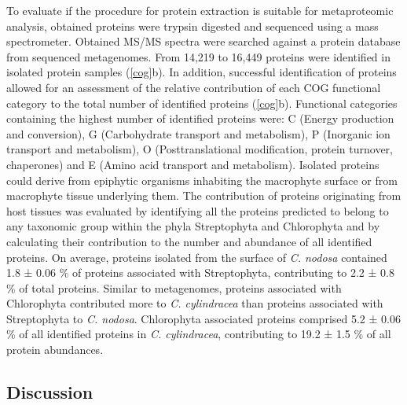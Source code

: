 \documentclass[12pt,]{article}
\begin{document}
To evaluate if the procedure for protein extraction is suitable for
metaproteomic analysis, obtained proteins were trypsin digested and
sequenced using a mass spectrometer. Obtained MS/MS spectra were
searched against a protein database from sequenced metagenomes. From
14,219 to 16,449 proteins were identified in isolated protein samples
(\autoref{cog}b). In addition, successful identification of proteins
allowed for an assessment of the relative contribution of each COG
functional category to the total number of identified proteins
(\autoref{cog}b). Functional categories containing the highest number of
identified proteins were: C (Energy production and conversion), G
(Carbohydrate transport and metabolism), P (Inorganic ion transport and
metabolism), O (Posttranslational modification, protein turnover,
chaperones) and E (Amino acid transport and metabolism). Isolated
proteins could derive from epiphytic organisms inhabiting the macrophyte
surface or from macrophyte tissue underlying them. The contribution of
proteins originating from host tissues was evaluated by identifying all
the proteins predicted to belong to any taxonomic group within the phyla
Streptophyta and Chlorophyta and by calculating their contribution to
the number and abundance of all identified proteins. On average,
proteins isolated from the surface of \emph{C. nodosa} contained 1.8 ±
0.06 \si{\percent} of proteins associated with Streptophyta,
contributing to 2.2 ± 0.8 \si{\percent} of total proteins. Similar to
metagenomes, proteins associated with Chlorophyta contributed more to
\emph{C. cylindracea} than proteins associated with Streptophyta to
\emph{C. nodosa}. Chlorophyta associated proteins comprised 5.2 ± 0.06
\si{\percent} of all identified proteins in \emph{C. cylindracea},
contributing to 19.2 ± 1.5 \si{\percent} of all protein abundances.

\hypertarget{discussion}{%
\subsection{Discussion}\label{discussion}}
\end{document}
